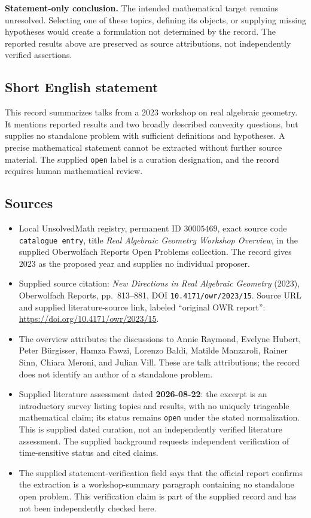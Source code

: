 \documentclass[11pt]{article}
\begin{document}
\textbf{Statement-only conclusion.} The intended mathematical target remains unresolved. Selecting one of these topics, defining its objects, or supplying missing hypotheses would create a formulation not determined by the record. The reported results above are preserved as source attributions, not independently verified assertions.
\subsection{Short English statement}
This record summarizes talks from a 2023 workshop on real algebraic geometry. It mentions reported results and two broadly described convexity questions, but supplies no standalone problem with sufficient definitions and hypotheses. A precise mathematical statement cannot be extracted without further source material. The supplied \texttt{open} label is a curation designation, and the record requires human mathematical review.
\subsection{Sources}
\begin{itemize}
\item Local UnsolvedMath registry, permanent ID \(30005469\), exact source code \texttt{catalogue entry}, title \emph{Real Algebraic Geometry Workshop Overview}, in the supplied Oberwolfach Reports Open Problems collection. The record gives 2023 as the proposed year and supplies no individual proposer.
\item Supplied source citation: \emph{New Directions in Real Algebraic Geometry} (2023), Oberwolfach Reports, pp.~813--881, DOI \texttt{10.4171/owr/2023/15}. Source URL and supplied literature-source link, labeled ``original OWR report'': \url{https://doi.org/10.4171/owr/2023/15}.
\item The overview attributes the discussions to Annie Raymond, Evelyne Hubert, Peter B\"urgisser, Hamza Fawzi, Lorenzo Baldi, Matilde Manzaroli, Rainer Sinn, Chiara Meroni, and Julian Vill. These are talk attributions; the record does not identify an author of a standalone problem.
\item Supplied literature assessment dated \textbf{2026-08-22}: the excerpt is an introductory survey listing topics and results, with no uniquely triageable mathematical claim; its status remains \texttt{open} under the stated normalization. This is supplied dated curation, not an independently verified literature assessment. The supplied background requests independent verification of time-sensitive status and cited claims.
\item The supplied statement-verification field says that the official report confirms the extraction is a workshop-summary paragraph containing no standalone open problem. This verification claim is part of the supplied record and has not been independently checked here.
\end{itemize}
\end{document}
